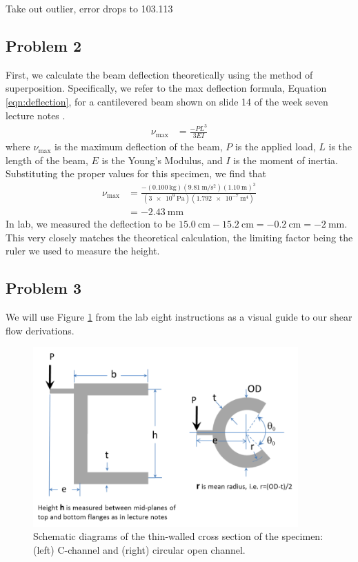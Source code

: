 \documentclass[12 pt]{report}
\begin{document}

Take out outlier, error drops to 103.113%

\subsection{Problem 2}
First, we calculate the beam deflection theoretically using the method of superposition. Specifically, we refer to the max deflection formula, Equation \ref{eqn:deflection}, for a cantilevered beam shown on slide \num{14} of the week seven lecture notes \cite{week_7_lecture_notes}.
\begin{align}\label{eqn:deflection}
	\nu_\text{max}&=\frac{-PL^3}{3EI}
\end{align}
where $\nu_\text{max}$ is the maximum deflection of the beam, $P$ is the applied load, $L$ is the length of the beam, $E$ is the Young's Modulus, and $I$ is the moment of inertia. Substituting the proper values for this specimen, we find that
\begin{align*}
	\nu_\text{max}&=\frac{-(\qty{0.100}{\kg})(\qty{9.81}{\m\per\s\squared})(\qty{1.10}{\m})^3}{(\qty{3e9}{\Pa})(\qty{1.792e-7}{\m^4})}\\
	&=\qty{-2.43}{\mm}
\end{align*}
In lab, we measured the deflection to be $\qty{15.0}{\cm}-\qty{15.2}{\cm}=\qty{-0.2}{\cm}=\qty{-2}{\mm}$. This very closely matches the theoretical calculation, the limiting factor being the ruler we used to measure the height.

\subsection{Problem 3}

We will use Figure \ref{fig:cross_sections} from the lab eight instructions \cite{lab_instructions} as a visual guide to our shear flow derivations.

\begin{figure}[htbp]
	\centering
	\includegraphics[width=4in]{images/cross sections}
	\caption{Schematic diagrams of the thin-walled cross section of the specimen: (left) C-channel and (right) circular open channel.}
	\label{fig:cross_sections}
\end{figure}
\end{document}
